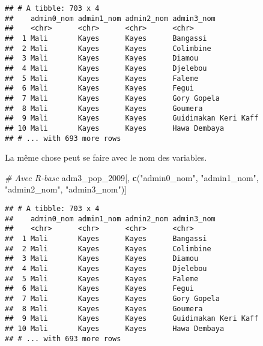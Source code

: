 \documentclass[]{book}
\newenvironment{Shaded}{\begin{snugshade}}{\end{snugshade}}
\newcommand{\KeywordTok}[1]{\textcolor[rgb]{0.13,0.29,0.53}{\textbf{#1}}}
\newcommand{\DecValTok}[1]{\textcolor[rgb]{0.00,0.00,0.81}{#1}}
\newcommand{\StringTok}[1]{\textcolor[rgb]{0.31,0.60,0.02}{#1}}
\newcommand{\CommentTok}[1]{\textcolor[rgb]{0.56,0.35,0.01}{\textit{#1}}}
\newcommand{\OperatorTok}[1]{\textcolor[rgb]{0.81,0.36,0.00}{\textbf{#1}}}
\newcommand{\NormalTok}[1]{#1}
\begin{document}
\begin{Shaded}
\end{Shaded}

\begin{verbatim}
## # A tibble: 703 x 4
##    admin0_nom admin1_nom admin2_nom admin3_nom          
##    <chr>      <chr>      <chr>      <chr>               
##  1 Mali       Kayes      Kayes      Bangassi            
##  2 Mali       Kayes      Kayes      Colimbine           
##  3 Mali       Kayes      Kayes      Diamou              
##  4 Mali       Kayes      Kayes      Djelebou            
##  5 Mali       Kayes      Kayes      Faleme              
##  6 Mali       Kayes      Kayes      Fegui               
##  7 Mali       Kayes      Kayes      Gory Gopela         
##  8 Mali       Kayes      Kayes      Goumera             
##  9 Mali       Kayes      Kayes      Guidimakan Keri Kaff
## 10 Mali       Kayes      Kayes      Hawa Dembaya        
## # ... with 693 more rows
\end{verbatim}

La même chose peut se faire avec le nom des variables.

\begin{Shaded}
\begin{Highlighting}[]
\CommentTok{# Avec R-base}
\NormalTok{adm3_pop_}\DecValTok{2009}\NormalTok{[, }\KeywordTok{c}\NormalTok{(}\StringTok{"admin0_nom"}\NormalTok{, }\StringTok{"admin1_nom"}\NormalTok{, }\StringTok{"admin2_nom"}\NormalTok{, }\StringTok{"admin3_nom"}\NormalTok{)]}
\end{Highlighting}
\end{Shaded}

\begin{verbatim}
## # A tibble: 703 x 4
##    admin0_nom admin1_nom admin2_nom admin3_nom          
##    <chr>      <chr>      <chr>      <chr>               
##  1 Mali       Kayes      Kayes      Bangassi            
##  2 Mali       Kayes      Kayes      Colimbine           
##  3 Mali       Kayes      Kayes      Diamou              
##  4 Mali       Kayes      Kayes      Djelebou            
##  5 Mali       Kayes      Kayes      Faleme              
##  6 Mali       Kayes      Kayes      Fegui               
##  7 Mali       Kayes      Kayes      Gory Gopela         
##  8 Mali       Kayes      Kayes      Goumera             
##  9 Mali       Kayes      Kayes      Guidimakan Keri Kaff
## 10 Mali       Kayes      Kayes      Hawa Dembaya        
## # ... with 693 more rows
\end{verbatim}
\end{document}

